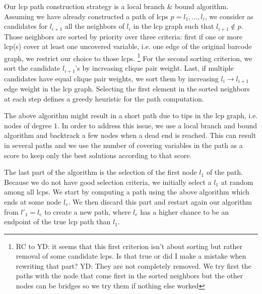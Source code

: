 Our lcp path construction strategy is a local branch \& bound algorithm.
Assuming we have already constructed a path of lcps $p = l_1,\ldots,l_i$, we consider as candidates for $l_{i+1}$ all the neighbors of $l_i$ in the lcp graph such that $l_{i+1}  \notin p$.
Those neighbors are sorted by priority over three criteria: first if one or more lcp(s) cover at least one uncovered variable, i.e. one edge of the original barcode graph, we restrict our choice to those lcps. \footnote{RC to YD: it seems that this first criterion isn't about sorting but rather removal of some candidate lcps. Is that true or did I make a mistake when rewriting that part? YD: They are not completely removed. We try first the paths with the node that come first in the sorted neighbors but the other nodes can be bridges so we try them if nothing else worked} %
For the second sorting criterion,  we sort the candidate $l_{i+1}$'s by increasing clique pair weight. %
Last, if multiple candidates have equal clique pair weights, we sort them by increasing $l_i \rightarrow l_{i+1}$ edge weight in the lcp graph.
Selecting the first element in the sorted neighbors at each step defines a greedy heuristic for the path computation.

The above algorithm might result in a short path due to tips in the lcp graph, i.e. nodes of degree $1$.
In order to address this issue, we use a local branch and bound algorithm and backtrack a few nodes when a dead end is reached.
This can result in several paths and we use the number of covering variables in the path as a score to keep only the best solutions according to that score.

The last part of the algorithm is the selection of the first node $l_1$ of the path.
Because we do not have good selection criteria, we initially select a $l_1$ at random among all lcps.
We start by computing a path using the above algorithm which ends at some node $l_e$.
We then discard this part and restart again our algorithm from $l'_1 = l_e$ to create a new path, where $l_e$ has a higher chance to be an endpoint of the true lcp path than $l_1$.


